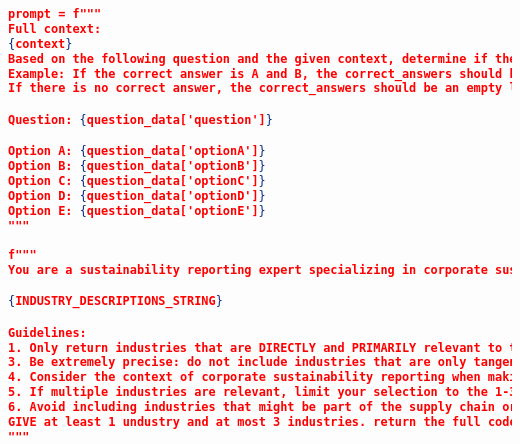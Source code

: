 \begin{appendices}
\begin{lstlisting}[language=json,firstnumber=1,label={lst:sba_prompt},caption={SBA check prompt}]
prompt = f"""
Full context:
{context}
Based on the following question and the given context, determine if there is only one correct answer option, by identifying all correct answer options based on the reference text and full content provided. 
Example: If the correct answer is A and B, the correct_answers should be ["A", "B"].
If there is no correct answer, the correct_answers should be an empty list [].

Question: {question_data['question']}

Option A: {question_data['optionA']}
Option B: {question_data['optionB']}
Option C: {question_data['optionC']}
Option D: {question_data['optionD']}
Option E: {question_data['optionE']}
"""
\end{lstlisting}


\begin{lstlisting}[language=json,firstnumber=1,label={lst:classifier_prompt},caption={Industry classification prompt}]
f"""
You are a sustainability reporting expert specializing in corporate sustainability reports using IFRS standards. Your task is to identify industries directly related to a given question, referring to these industry descriptions:

{INDUSTRY_DESCRIPTIONS_STRING}

Guidelines:
1. Only return industries that are DIRECTLY and PRIMARILY relevant to the company's core business activities mentioned in the question.
3. Be extremely precise: do not include industries that are only tangentially related or those that the company might interact with but are not part of its primary operations.
4. Consider the context of corporate sustainability reporting when making your decision.
5. If multiple industries are relevant, limit your selection to the 1-3 most applicable ones.
6. Avoid including industries that might be part of the supply chain or waste management unless they are explicitly stated as a core part of the company's operations.
GIVE at least 1 undustry and at most 3 industries. return the full code like b1-apparel-accessories-and-footwear.
"""
\end{lstlisting}

\end{appendices}